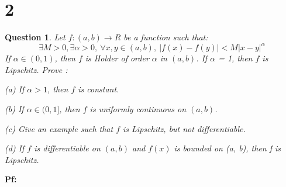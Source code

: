 \documentclass{article}
\newtheorem{question}{Question}
\begin{document}
\section*{2}
\begin{myBox}[]{}
    \begin{question}
        Let $f : (a, b) \rightarrow R$ be a function such that:
        $$\exists M>0,\exists\alpha>0,\ \forall x,y\in(a,b),\ |f(x)-f(y)|<M|x-y|^\alpha$$
        If $\alpha\in(0,1)$, then $f$ is Holder of order $\alpha$ in $(a, b)$. If $\alpha$ = 1, then $f$ is Lipschitz.
        Prove :
    
        (a) If $\alpha>1$, then $f$ is constant.
    
        (b) If $\alpha\in(0,1]$, then $f$ is uniformly continuous on $(a, b)$.
    
        (c) Give an example such that $f$ is Lipschitz, but not differentiable.
    
        (d) If $f$ is differentiable on $(a, b)$ and $f(x)$ is bounded on (a, b), then f is Lipschitz.
    \end{question}
\end{myBox}

\textbf{Pf:}
\end{document}
